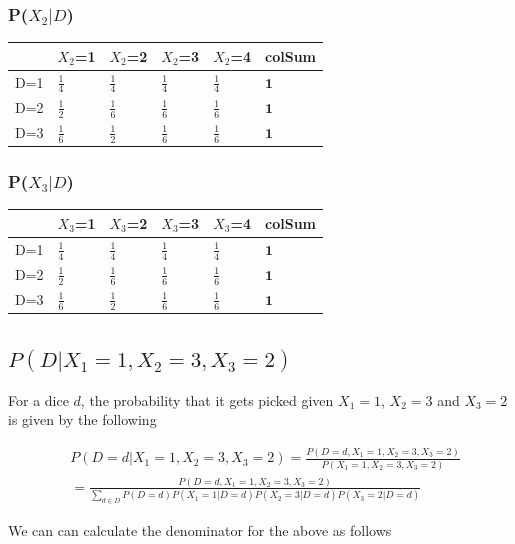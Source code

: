 \documentclass[12pt, letterpaper]{article}
\begin{document}
\subsubsection{P($X_2|D$)}
\begin{tabular}{l|llll|l}
    & $X_2$=1       & $X_2$=2       & $X_2$=3       & $X_2$=4       & \textbf{colSum} \\
\hline
D=1 & $\frac{1}{4}$   & $\frac{1}{4}$   & $\frac{1}{4}$   & $\frac{1}{4}$   & $\textbf{1}$  \\
D=2 & $\frac{1}{2}$   & $\frac{1}{6}$   & $\frac{1}{6}$   & $\frac{1}{6}$   & $\textbf{1}$  \\
D=3 & $\frac{1}{6}$   & $\frac{1}{2}$   & $\frac{1}{6}$   & $\frac{1}{6}$   & $\textbf{1}$  \\
\end{tabular}

\subsubsection{P($X_3|D$)}
\begin{tabular}{l|llll|l}
    & $X_3$=1       & $X_3$=2       & $X_3$=3       & $X_3$=4       & \textbf{colSum} \\
\hline
D=1 & $\frac{1}{4}$   & $\frac{1}{4}$   & $\frac{1}{4}$   & $\frac{1}{4}$   & $\textbf{1}$  \\
D=2 & $\frac{1}{2}$   & $\frac{1}{6}$   & $\frac{1}{6}$   & $\frac{1}{6}$   & $\textbf{1}$  \\
D=3 & $\frac{1}{6}$   & $\frac{1}{2}$   & $\frac{1}{6}$   & $\frac{1}{6}$   & $\textbf{1}$  \\
\end{tabular}

\subsection{$P(D|X_1=1,X_2=3,X_3=2)$}

For a dice $d$, the probability that it gets picked given $X_1=1$, $X_2=3$ and $X_3=2$ is given by the following

\begin{align*}
&P(D=d|X_1=1,X_2=3,X_3=2) = \frac{P(D=d,X_1=1,X_2=3,X_3=2)}{P(X_1=1,X_2=3,X_3=2)}\\ 
                            &= \frac{P(D=d,X_1=1,X_2=3,X_3=2)}{\sum_{d\in D}{P(D=d)P(X_1=1|D=d)P(X_2=3|D=d)P(X_3=2|D=d)}}
\end{align*}

We can can calculate the denominator for the above as follows
\end{document}
